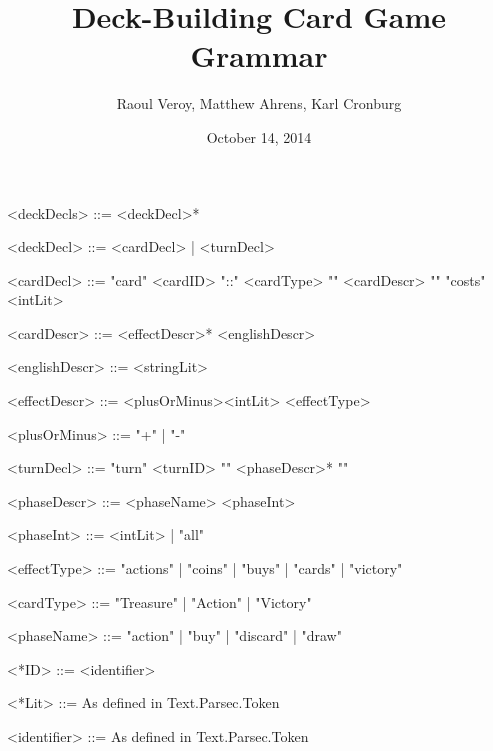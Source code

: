 \documentclass{article}
\title{Deck-Building Card Game Grammar}
\author{Raoul Veroy, Matthew Ahrens, Karl Cronburg}
\date{October 14, 2014}
\begin{document}
\maketitle
\thispagestyle{empty}

\begin{grammar}


<deckDecls>  ::= <deckDecl>*

<deckDecl>   ::= <cardDecl> | <turnDecl>


<cardDecl>    ::= "card" <cardID> "::" <cardType> "{" <cardDescr> "}" "costs" <intLit>

<cardDescr>   ::= <effectDescr>* <englishDescr>

<englishDescr> ::= <stringLit>

<effectDescr>  ::= <plusOrMinus><intLit> <effectType>

<plusOrMinus> ::= "+" | "-"


<turnDecl>   ::= "turn" <turnID> "{" <phaseDescr>* "}"

<phaseDescr> ::= <phaseName> <phaseInt>

<phaseInt>   ::= <intLit> | "all"


<effectType>  ::= "actions"   | "coins"  | "buys" | "cards" | "victory"

<cardType>    ::= "Treasure" | "Action" | "Victory"

<phaseName>   ::= "action"   | "buy"    | "discard" | "draw"

<*ID>         ::= <identifier>

<*Lit>      ::= As defined in Text.Parsec.Token

<identifier>  ::= As defined in Text.Parsec.Token

%
%
%
%
\end{grammar}
\end{document}
